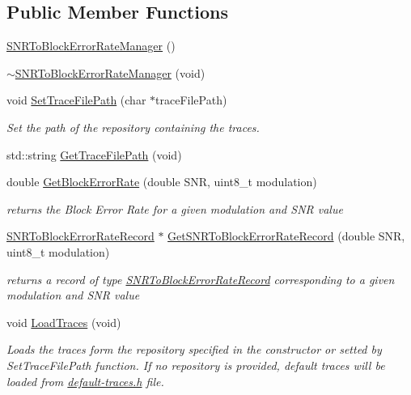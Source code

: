 \subsection*{Public Member Functions}
\begin{DoxyCompactItemize}
\item 
\hyperlink{classns3_1_1SNRToBlockErrorRateManager_a3dfb3f53b44e0b2d03655551df6fcad1}{S\+N\+R\+To\+Block\+Error\+Rate\+Manager} ()
\item 
\hyperlink{classns3_1_1SNRToBlockErrorRateManager_ac350ea76815a33cbda0c111b09158674}{$\sim$\+S\+N\+R\+To\+Block\+Error\+Rate\+Manager} (void)
\item 
void \hyperlink{classns3_1_1SNRToBlockErrorRateManager_ad7896854e5c122930da728e99f13a6a2}{Set\+Trace\+File\+Path} (char $\ast$trace\+File\+Path)
\begin{DoxyCompactList}\small\item\em Set the path of the repository containing the traces. \end{DoxyCompactList}\item 
std\+::string \hyperlink{classns3_1_1SNRToBlockErrorRateManager_a72f2b396f2cdebc877798500bfb8c8aa}{Get\+Trace\+File\+Path} (void)
\item 
double \hyperlink{classns3_1_1SNRToBlockErrorRateManager_ad312da099d85e358f5185dbadc4e5444}{Get\+Block\+Error\+Rate} (double S\+NR, uint8\+\_\+t modulation)
\begin{DoxyCompactList}\small\item\em returns the Block Error Rate for a given modulation and S\+NR value \end{DoxyCompactList}\item 
\hyperlink{classns3_1_1SNRToBlockErrorRateRecord}{S\+N\+R\+To\+Block\+Error\+Rate\+Record} $\ast$ \hyperlink{classns3_1_1SNRToBlockErrorRateManager_a95032f946ee3ee4125b01654fda54fe4}{Get\+S\+N\+R\+To\+Block\+Error\+Rate\+Record} (double S\+NR, uint8\+\_\+t modulation)
\begin{DoxyCompactList}\small\item\em returns a record of type \hyperlink{classns3_1_1SNRToBlockErrorRateRecord}{S\+N\+R\+To\+Block\+Error\+Rate\+Record} corresponding to a given modulation and S\+NR value \end{DoxyCompactList}\item 
void \hyperlink{classns3_1_1SNRToBlockErrorRateManager_af5a203f2ae5dd3477ec616b6d0337f62}{Load\+Traces} (void)
\begin{DoxyCompactList}\small\item\em Loads the traces form the repository specified in the constructor or setted by Set\+Trace\+File\+Path function. If no repository is provided, default traces will be loaded from \hyperlink{default-traces_8h}{default-\/traces.\+h} file. \end{DoxyCompactList}\item 

\end{DoxyCompactItemize}
